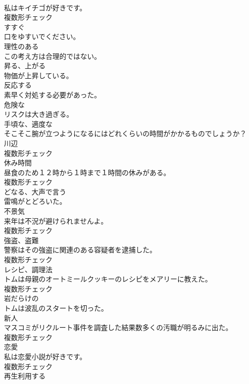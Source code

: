 \documentclass[8pt]{extreport}
\begin{document}
\begin{CJK}{UTF8}{min}
\\	私はキイチゴが好きです。	
\\	複数形チェック
\\	[動詞]	すすぐ	
\\	口をゆすいでください。	
\\	[形容詞]	理性のある	
\\	この考え方は合理的ではない。	
\\	[形容詞]	昇る、上がる	
\\	物価が上昇している。	
\\	[動詞]	反応する	
\\	素早く対処する必要があった。	
\\	[形容詞]	危険な	
\\	リスクは大き過ぎる。	
\\	[副詞]	手頃な、適度な	
\\	そこそこ腕が立つようになるにはどれくらいの時間がかかるものでしょうか？	
\\	[名詞]	川辺	
\\	複数形チェック
\\	[名詞]	休み時間	
\\	昼食のため１２時から１時まで１時間の休みがある。	
\\	複数形チェック
\\	[動詞]	どなる、大声で言う	
\\	雷鳴がとどろいた。	
\\	[名詞]	不景気	
\\	来年は不況が避けられませんよ。	
\\	複数形チェック
\\	[名詞]	強盗、盗難	
\\	警察はその強盗に関連のある容疑者を逮捕した。	
\\	複数形チェック
\\	[名詞]	レシピ、調理法	
\\	トムは母親のオートミールクッキーのレシピをメアリーに教えた。	
\\	複数形チェック
\\	[形容詞]	岩だらけの	
\\	トムは波乱のスタートを切った。	
\\	[名詞]	新人	
\\	マスコミがリクルート事件を調査した結果数多くの汚職が明るみに出た。	
\\	複数形チェック
\\	[名詞]	恋愛	
\\	私は恋愛小説が好きです。	
\\	複数形チェック
\\	[動詞]	再生利用する	

\end{CJK}
\end{document}

